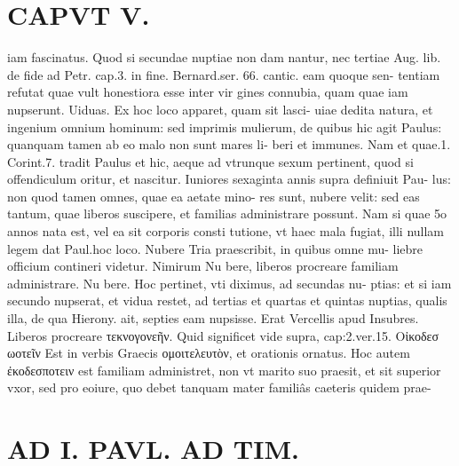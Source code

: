 \documentclass{article}
\begin{document}
\begin{pages}
\section*{CAPVT  V. }
\marginpar{[ p.299 ]}\pstart iam fascinatus. Quod si secundae nuptiae non dam nantur, nec tertiae Aug. lib.  de fide ad Petr. cap.3. in fine. Bernard.ser. 66. cantic. eam quoque sen- tentiam refutat quae vult honestiora esse inter vir gines connubia, quam quae iam nupserunt. Uiduas. Ex hoc loco apparet, quam sit lasci- uiae dedita natura, et ingenium omnium hominum: sed imprimis mulierum, de quibus hic agit Paulus: quanquam tamen ab eo malo non sunt mares li- beri et immunes. Nam et quae.1. Corint.7. tradit Paulus et hic, aeque ad vtrunque sexum pertinent, quod si offendiculum oritur, et nascitur. Iuniores sexaginta annis supra definiuit Pau- lus: non quod tamen omnes, quae ea aetate mino- res sunt, nubere velit: sed eas tantum, quae liberos suscipere, et familias administrare possunt. Nam si quae 5o annos nata est, vel ea sit corporis consti tutione, vt haec mala fugiat, illi nullam legem dat Paul.hoc loco. Nubere Tria praescribit, in quibus omne mu- liebre officium contineri videtur. Nimirum Nu bere, liberos procreare familiam administrare. Nu bere. Hoc pertinet, vti diximus, ad secundas nu- ptias: et si iam secundo nupserat, et vidua restet, ad tertias et quartas et quintas nuptias, qualis illa, de qua Hierony. ait, septies eam nupsisse. Erat Vercellis apud Insubres. Liberos procreare τεκνογονεῆν. Quid significet vide supra, cap:2.ver.15. Oἰκοδεσ ωοτεῖν Est in verbis Graecis ομοιτελευτὸν, et orationis ornatus. Hoc autem ἐκοδεσποτειν est familiam administret, non vt marito suo praesit, et sit superior vxor, sed pro eoiure, quo debet tanquam mater familiâs caeteris quidem prae-  \pend
\section*{AD I. PAVL. AD TIM. }
\marginpar{[ p.300 ]}\pstart {}
{}

\end{pages}
\end{document}
